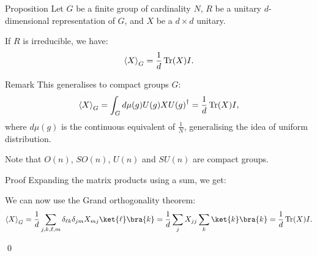 \documentclass[a4paper]{article}
\begin{document}
\begin{parag}{Proposition}
    Let $G$ be a finite group of cardinality $N$, $R$ be a unitary $d$-dimensional representation of $G$, and $X$ be a $d \times d$ unitary.

    If $R$ is irreducible, we have: 
    \[\left\langle X \right\rangle_G = \frac{1}{d} \Tr\left(X\right) I.\]

    \begin{subparag}{Remark}
        This generalises to compact groups $G$: 
        \[\left\langle X \right\rangle_G = \int_{G} d \mu\left(g\right) U\left(g\right) X U\left(g\right)^{\dagger} = \frac{1}{d}\Tr\left(X\right)I,\]
        where $d\mu\left(g\right)$ is the continuous equivalent of $\frac{1}{N}$, generalising the idea of uniform distribution.

        Note that $O\left(n\right)$, $SO\left(n\right)$, $U\left(n\right)$ and $SU\left(n\right)$ are compact groups.
    \end{subparag}
    
    \begin{subparag}{Proof}
        Expanding the matrix products using a sum, we get: 

        We can now use the Grand orthogonality theorem: 
        \[\left\langle X \right\rangle_G = \frac{1}{d} \sum_{j, k, \ell, m} \delta_{\ell k} \delta_{jm} X_{mj} \ket{\ell} \bra{k} = \frac{1}{d} \sum_{j} X_{jj} \sum_{k} \ket{k}\bra{k} = \frac{1}{d} \Tr\left(X\right) I.\]

        \qed
    \end{subparag}
\end{parag}
\end{document}
